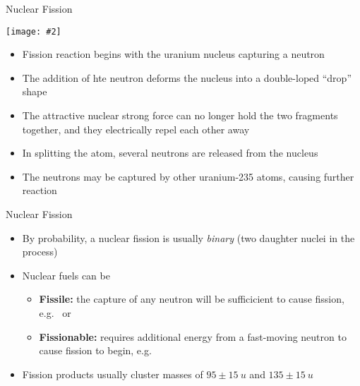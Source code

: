 \documentclass[12pt,compress,aspectratio=169]{beamer}
\newcommand{\pic}[2]{\texttt{[image: \#2]}}
\begin{document}
\begin{frame}{Nuclear Fission}
  \begin{center}
    \pic{.5}{graphics/fission1}
  \end{center}
  \begin{itemize}
  \item\vspace{-.25in}Fission reaction begins with the uranium nucleus
    capturing a neutron
  \item The addition of hte neutron deforms the nucleus into a double-loped
    ``drop'' shape
  \item The attractive nuclear strong force can no longer hold the two fragments
    together, and they electrically repel each other away
  \item In splitting the atom, several neutrons are released from the nucleus
  \item The neutrons may be captured by other uranium-235 atoms, causing further
    reaction
  \end{itemize}
\end{frame}



\begin{frame}{Nuclear Fission}
  \begin{itemize}
  \item By probability, a nuclear fission is usually \emph{binary} (two
    daughter nuclei in the process)
  \item Nuclear fuels can be
    \begin{itemize}
    \item\textbf{Fissile:} the capture of any neutron will be sufficicient to
      cause fission, e.g.\  or 
    \item\textbf{Fissionable:} requires additional energy from a fast-moving
      neutron to cause fission to begin, e.g.\ 
    \end{itemize}
  \item Fission products usually cluster masses of $95\pm\SI{15}{u}$ and
    $135\pm\SI{15}{u}$
  \end{itemize}
\end{frame}
\end{document}
